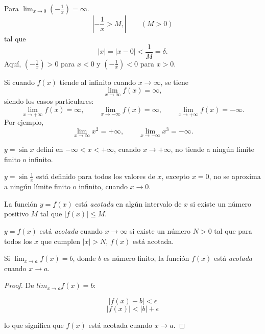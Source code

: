 

\begin{example}
  Para \( \lim_{x \to 0} \left( - \frac{1}{x} \right) = \infty \).
  \[
  \left| - \frac{1}{x} > M, \right| \qquad (M > 0)
  \]
  tal que
  \[
  |x| = |x - 0| < \frac{1}{M} = \delta.
  \]
  Aquí, \( (- \frac{1}{x}) > 0 \) para \( x < 0 \) y \( (- \frac{1}{x}) < 0 \) para \( x > 0 \).
\end{example}




Si cuando \( f(x) \) tiende al infinito cuando \( x \to \infty \), se tiene
\[ \lim_{x \to \infty} f(x) = \infty, \]
siendo los casos particulares:
\[
\lim_{x \to +\infty} f(x) =  \infty, \qquad
\lim_{x \to -\infty} f(x) =  \infty, \qquad
\lim_{x \to +\infty} f(x) = -\infty.
\]
Por ejemplo,
\[
\lim_{x \to \infty}  x^2 = +\infty, \qquad
\lim_{x \to -\infty} x^3 = -\infty.
\]


\begin{example}
  \( y = \sin x \) defini en \( -\infty < x < +\infty \), cuando \( x \to +\infty \), no tiende a ningún límite finito o infinito.
\end{example}


\begin{example} \label{ej:sen1lx}
  \( y = \sin \frac{1}{x} \) está definido para todos los valores de \( x \), excepto \( x = 0 \), no se aproxima a ningún límite finito o infinito, cuando \( x \to 0 \).
\end{example}




\begin{definition}
  La función $y = f(x)$ está \emph{acotada} en algún intervalo de $x$ si existe un número positivo $M$ tal que $|f(x)| \le M$.
\end{definition}


\begin{definition}
  $y = f(x)$ está \emph{acotada} cuando $x \to \infty$ si existe un número $N > 0$ tal que para todos los $x$ que cumplen $|x| > N$, $f(x)$ está acotada.
\end{definition}


\begin{theorem}
  Si $\lim_{x \to a} f(x) = b$, donde $b$ es número finito, la función $f(x)$ está \emph{acotada} cuando $x \to a$.
\end{theorem}

\begin{proof}
  De $lim_{x \to a} f(x) = b$:

  $$|f(x) - b| < \epsilon$$
  $$|f(x)| < |b| + \epsilon$$

  lo que significa que $f(x)$ está acotada cuando $x \to a$.
\end{proof}


